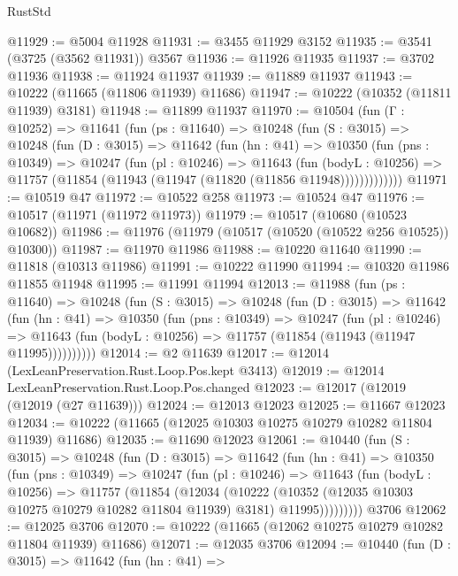 \begin{lexlean}{RustStd}
\begin{coremodule}
@11929 := @5004 @11928
@11931 := @3455 @11929 @3152
@11935 := @3541 (@3725 (@3562 @11931)) @3567
@11936 := @11926 @11935
@11937 := @3702 @11936
@11938 := @11924 @11937
@11939 := @11889 @11937
@11943 := @10222 (@11665 (@11806 @11939) @11686)
@11947 := @10222 (@10352 (@11811 @11939) @3181)
@11948 := @11899 @11937
@11970 := @10504
    (fun (Γ : @10252) =>
    @11641
      (fun (ps : @11640) =>
      @10248
        (fun (S : @3015) =>
        @10248
          (fun (D : @3015) =>
          @11642
            (fun (hn : @41) =>
            @10350
              (fun (pns : @10349) =>
              @10247
                (fun (pl : @10246) =>
                @11643
                  (fun (bodyL : @10256) =>
                  @11757 (@11854 (@11943 (@11947 (@11820 (@11856 @11948)))))))))))))
@11971 := @10519 @47
@11972 := @10522 @258
@11973 := @10524 @47
@11976 := @10517 (@11971 (@11972 @11973))
@11979 := @10517 (@10680 (@10523 @10682))
@11986 := @11976 (@11979 (@10517 (@10520 (@10522 @256 @10525)) @10300))
@11987 := @11970 @11986
@11988 := @10220 @11640
@11990 := @11818 (@10313 @11986)
@11991 := @10222 @11990
@11994 := @10320 @11986 @11855 @11948
@11995 := @11991 @11994
@12013 := @11988
    (fun (ps : @11640) =>
    @10248
      (fun (S : @3015) =>
      @10248
        (fun (D : @3015) =>
        @11642
          (fun (hn : @41) =>
          @10350
            (fun (pns : @10349) =>
            @10247
              (fun (pl : @10246) =>
              @11643 (fun (bodyL : @10256) => @11757 (@11854 (@11943 (@11947 @11995))))))))))
@12014 := @2 @11639
@12017 := @12014 (LexLeanPreservation.Rust.Loop.Pos.kept @3413)
@12019 := @12014 LexLeanPreservation.Rust.Loop.Pos.changed
@12023 := @12017 (@12019 (@12019 (@27 @11639)))
@12024 := @12013 @12023
@12025 := @11667 @12023
@12034 := @10222 (@11665 (@12025 @10303 @10275 @10279 @10282 @11804 @11939) @11686)
@12035 := @11690 @12023
@12061 := @10440
    (fun (S : @3015) =>
    @10248
      (fun (D : @3015) =>
      @11642
        (fun (hn : @41) =>
        @10350
          (fun (pns : @10349) =>
          @10247
            (fun (pl : @10246) =>
            @11643
              (fun (bodyL : @10256) =>
              @11757
                (@11854
                  (@12034
                    (@10222
                      (@10352 (@12035 @10303 @10275 @10279 @10282 @11804 @11939) @3181)
                      @11995)))))))))
    @3706
@12062 := @12025 @3706
@12070 := @10222 (@11665 (@12062 @10275 @10279 @10282 @11804 @11939) @11686)
@12071 := @12035 @3706
@12094 := @10440
    (fun (D : @3015) =>
    @11642
      (fun (hn : @41) =>

\end{coremodule}
\end{lexlean}
